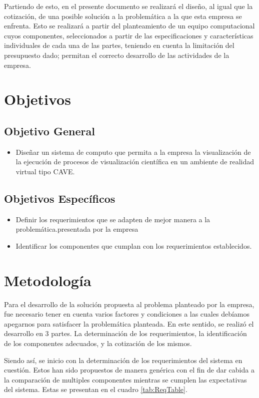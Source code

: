 \documentclass[conference,onecolumn]{IEEEtran}
\begin{document}
Partiendo de esto, en el presente documento se realizará el diseño, al igual que la cotización, de una posible solución a la problemática a la que esta empresa se enfrenta. Esto se realizará a partir del planteamiento de un equipo computacional cuyos componentes, seleccionados a partir de las especificaciones y características individuales de cada una de las partes, teniendo en cuenta la limitación del presupuesto dado; permitan el correcto desarrollo de las actividades de la empresa. \medbreak 

\section{Objetivos}
\subsection{Objetivo General}
\begin{itemize}
    \item Diseñar un sistema de computo que permita a la empresa la visualización de la ejecución de procesos de visualización científica en un ambiente de realidad virtual tipo CAVE. \medbreak
\end{itemize}

\subsection{Objetivos Específicos}
\begin{itemize}
    \item Definir los requerimientos que se adapten de mejor manera a la problemática.presentada por la empresa \medbreak
    \item Identificar los componentes que cumplan con los requerimientos establecidos.\medbreak
\end{itemize}

\section{Metodología}
Para el desarrollo de la solución propuesta al problema planteado por la empresa, fue necesario tener en cuenta varios factores y condiciones a las cuales debíamos apegarnos para satisfacer la problemática planteada. En este sentido, se realizó el desarrollo en 3 partes. La determinación de los requerimientos, la identificación de los componentes adecuados, y la cotización de los mismos.

Siendo así, se inicio con la determinación de los requerimientos del sistema en cuestión. Estos han sido propuestos de manera genérica con el fin de dar cabida a la comparación de multiples componentes mientras se cumplen las expectativas del sistema. Estas se presentan en el cuadro \ref{tab:ReqTable}.
\end{document}
